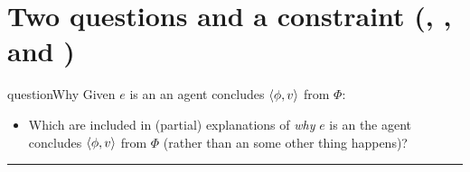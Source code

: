 \documentclass[10pt]{article}
\newcommand{\squareBullet}{\textcolor{black}{\raisebox{.45ex}{\rule{.6ex}{.6ex}}}}
\newcommand\lLine{{\color{gray} \noindent\rule{\textwidth}{0.4pt}}}
\begin{document}
\begin{comment}
  The constraint on reasoning that is stated with these abstraction is intended to be theory-neutral level.
\end{comment}


\begin{comment}
  If you like, think of this as a relation of support.
  However, \fofr{1} are understood descriptively, i.e.\ there's no normative constraints on \fofr{1} here.
  If you'd like additional motivation for this sort of thing, consider propositional justification.
\end{comment}

\newpage

\section{Two questions and a constraint \hfill (\qWhy{}, \qHow{}, and \issueInclusion{})}
\label{sec:target}

\vfill

\begin{comment}
  With from and \fofr{1} in hand, two questions.
\end{comment}

\begin{note}
  \begin{question}{questionWhy}{\qWhy{}}
    Given \(e\) is an  an agent concludes \(\langle\phi, v\rangle\) from \(\Phi\):
    \begin{itemize}[label = \squareBullet]
    \item
      Which  are included in (partial) explanations of \emph{why} \(e\) is an  the agent concludes \(\langle\phi, v\rangle\) from \(\Phi\) (rather than an  some other thing happens)?
    \end{itemize}
    \vspace{-1.25\baselineskip}
  \end{question}
\end{note}


\lLine
\end{document}
